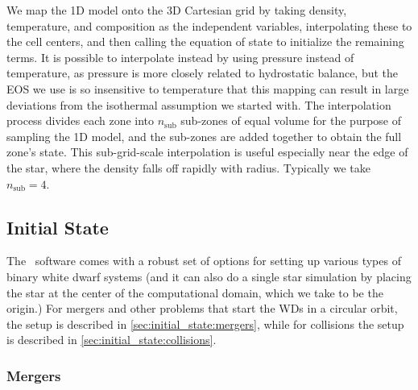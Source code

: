 \documentclass[12pt]{article}
\begin{document}
We map the 1D model onto the 3D Cartesian grid by taking density,
temperature, and composition as the independent variables,
interpolating these to the cell centers, and then calling the equation
of state to initialize the remaining terms. It is possible to interpolate
instead by using pressure instead of temperature, as pressure is more 
closely related to hydrostatic balance, but the EOS we use is so 
insensitive to temperature that this mapping can result in large 
deviations from the isothermal assumption we started with.  The 
interpolation process divides each zone into $n_{\text{sub}}$ 
sub-zones of equal volume for
the purpose of sampling the 1D model, and the sub-zones are added
together to obtain the full zone's state. This
sub-grid-scale interpolation is useful especially near the edge of the star,
where the density falls off rapidly with radius. Typically we take 
$n_{\text{sub}} = 4$.



\subsection{Initial State}
\label{sec:initial_state}

The \wdmerger\ software comes with a robust set of options for setting up
various types of binary white dwarf systems (and it can also do a single
star simulation by placing the star at the center of the computational domain,
which we take to be the origin.) For mergers and other problems that start
the WDs in a circular orbit, the setup is described in \autoref{sec:initial_state:mergers},
while for collisions the setup is described in \autoref{sec:initial_state:collisions}.



\subsubsection{Mergers}
\label{sec:initial_state:mergers}
\end{document}
